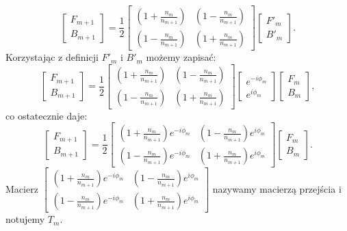 \begin{equation}
    \left[
    \begin{array}{c}
    F_{m+1} \\ B_{m+1}
    \end{array}
    \right] = \frac 12
    \left[
    \begin{array}{cc}
         (1 + \frac{n_m}{n_{m+1}}) &  (1 - \frac{n_m}{n_{m+1}})\\
         (1 - \frac{n_m}{n_{m+1}}) &  (1 + \frac{n_m}{n_{m+1}})
    \end{array}
    \right]
    \left[
    \begin{array}{c}
    F'_{m} \\ B'_{m}
    \end{array}
    \right].
\end{equation}
Korzystając z definicji $F'_m$ i $B'_m$ możemy zapisać:
\begin{equation}
    \left[
    \begin{array}{c}
    F_{m+1} \\ B_{m+1}
    \end{array}
    \right] = \frac 12
    \left[
    \begin{array}{cc}
         (1 + \frac{n_m}{n_{m+1}}) &  (1 - \frac{n_m}{n_{m+1}})\\
         (1 - \frac{n_m}{n_{m+1}}) &  (1 + \frac{n_m}{n_{m+1}})
    \end{array}
    \right]
    \left[
    \begin{array}{c}
    e^{-i\phi_m} \\ e^{i\phi_m}
    \end{array}
    \right]
    \left[
    \begin{array}{c}
    F_{m} \\ B_{m}
    \end{array}
    \right],
\end{equation}
co ostatecznie daje:
\begin{equation}
    \left[
    \begin{array}{c}
    F_{m+1} \\ B_{m+1}
    \end{array}
    \right] = \frac 12
    \left[
    \begin{array}{cc}
         (1 + \frac{n_m}{n_{m+1}})e^{-i\phi_m} &  (1 - \frac{n_m}{n_{m+1}})e^{i\phi_m}\\
         (1 - \frac{n_m}{n_{m+1}})e^{-i\phi_m} &  (1 + \frac{n_m}{n_{m+1}})e^{i\phi_m}
    \end{array}
    \right]
    \left[
    \begin{array}{c}
    F_{m} \\ B_{m}
    \end{array}
    \right].
\end{equation}
Macierz $    \left[
    \begin{array}{cc}
         (1 + \frac{n_m}{n_{m+1}})e^{-i\phi_m} &  (1 - \frac{n_m}{n_{m+1}})e^{i\phi_m}\\
         (1 - \frac{n_m}{n_{m+1}})e^{-i\phi_m} &  (1 + \frac{n_m}{n_{m+1}})e^{i\phi_m}
    \end{array}
    \right]$ nazywamy macierzą przejścia i notujemy $T_m$.
    
